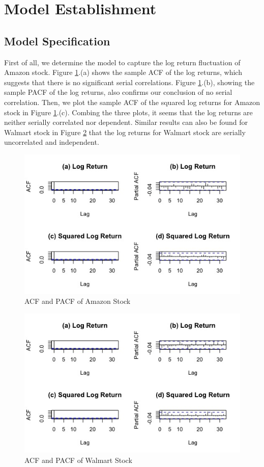 \documentclass[paper=a4, fontsize=13pt]{article}
\begin{document}
\section{Model Establishment}
\subsection{Model Specification}
First of all, we determine the model to capture the log return fluctuation of Amazon stock. Figure \ref{cf_AMZN}.(a) shows the sample ACF of the log returns, which suggests that there is no significant serial correlations. Figure \ref{cf_AMZN}.(b), showing the sample PACF of the log returns, also confirms our conclusion of no serial correlation. Then, we plot the sample ACF of the squared log returns for Amazon stock in Figure \ref{cf_AMZN}.(c). Combing the three plots, it seems that the log returns are neither serially correlated nor dependent. Similar results can also be found for Walmart stock in Figure \ref{cf_WMT} that the log returns for Walmart stock are serially uncorrelated and independent.

\begin{figure}[!htbp]
\centering
\includegraphics[scale = 0.7]{img/cf_AMZN}
\caption{ACF and PACF of Amazon Stock}
\label{cf_AMZN}
\end{figure}

\begin{figure}[!htbp]
\centering
\includegraphics[scale = 0.7]{img/cf_WMT}
\caption{ACF and PACF of Walmart Stock}
\label{cf_WMT}
\end{figure}
\end{document}
